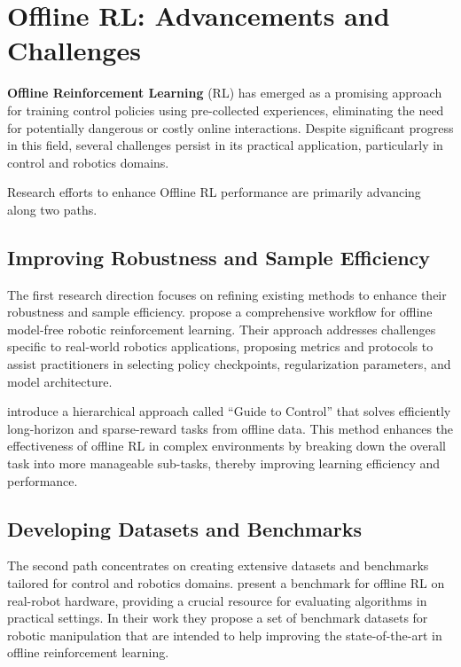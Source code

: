 \section{Offline RL: Advancements and Challenges}

\textbf{Offline Reinforcement Learning} (RL)
has emerged as a promising approach for training control
policies using pre-collected experiences,
eliminating the need for potentially dangerous or
costly online interactions. Despite significant progress
in this field, several challenges persist in
its practical application, particularly in control
and robotics domains.

Research efforts to enhance Offline RL performance are
primarily advancing along two paths.

\subsection{Improving Robustness and Sample Efficiency}

The first research direction focuses on refining
existing methods to enhance their robustness and
sample efficiency. \cite{kumar2021} propose a comprehensive
workflow for offline model-free robotic reinforcement
learning. Their approach addresses challenges specific
to real-world robotics applications, proposing
metrics and protocols to assist practitioners in
selecting policy checkpoints, regularization parameters,
and model architecture.

\cite{ijcai2023} introduce a hierarchical approach called
``Guide to Control'' that solves efficiently long-horizon
and sparse-reward tasks from offline data.
This method enhances the effectiveness
of offline RL in complex environments by breaking down the overall
task into more manageable sub-tasks, thereby improving learning
efficiency and performance.

\subsection{Developing Datasets and Benchmarks}

The second path concentrates on creating extensive datasets
and benchmarks tailored for control and robotics domains.
\cite{gurtler2023} present a benchmark for offline RL
on real-robot hardware, providing a crucial resource for
evaluating algorithms in practical settings.
In their work they propose a set of
benchmark datasets for robotic manipulation
that are intended to help improving the
state-of-the-art in offline reinforcement learning.


